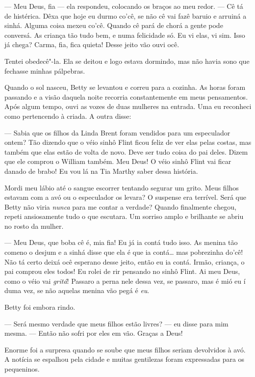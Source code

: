 --- Meu Deus, fia --- ela respondeu, colocando os braços ao meu redor.
--- Cê tá de histérica. Dêxa que hoje eu durmo co'cê, se não cê vai fazê
baruio e arruiná a sinhá. Alguma coisa mexeu co'cê. Quando cê pará de
chorá a gente pode conversá. As criança tão tudo bem, e numa felicidade
só. Eu vi elas, vi sim. Isso já chega? Carma, fia, fica quieta! Desse
jeito vão ouvi ocê.

Tentei obedecê"-la. Ela se deitou e logo estava dormindo, mas não havia
sono que fechasse minhas pálpebras.

Quando o sol nasceu, Betty se levantou
e correu para a cozinha. As horas foram passando e a visão daquela noite
recorria constantemente em meus pensamentos. Após algum tempo, ouvi as
vozes de duas mulheres na entrada. Uma eu reconheci como pertencendo à
criada. A outra disse:

--- Sabia que os filhos da Linda Brent foram vendidos para um
especulador ontem? Tão dizendo que o véio sinhô Flint ficou feliz de ver
elas pelas costas, mas também que elas estão de volta de novo. Deve ser
tudo coisa do pai deles. Dizem que ele comprou o William também. Meu
Deus! O véio sinhô Flint vai ficar danado de brabo! Eu vou lá na Tia
Marthy saber dessa história.

Mordi meu lábio até o sangue escorrer
tentando segurar um grito. Meus filhos estavam com a avó ou o
especulador os levara? O suspense era terrível. Será que Betty não viria
\emph{nunca} para me contar a verdade? Quando finalmente chegou, repeti
ansiosamente tudo o que escutara. Um sorriso amplo e brilhante se abriu
no rosto da mulher.

--- Meu Deus, que boba cê é, mia fia! Eu já ia contá tudo isso. As
menina tão comeno o desjum e a sinhá disse que ela é que ia
contá\ldots{} mas pobrezinha do'cê! Não tá certo deixá ocê esperano
desse jeito, então eu ia contá. Irmão, criança, o pai comprou eles
todos! Eu rolei de rir pensando no sinhô Flint. Ai meu Deus, como o véio
vai \emph{gritá}! Passaro a perna nele dessa vez, se passaro, mas é mió
eu í duma vez, se não aquelas menina vão pegá é \emph{eu}.

Betty foi embora rindo.

--- Será mesmo verdade que meus filhos estão livres? --- eu disse para
mim mesma. --- Então não sofri por eles em vão. Graças a Deus!

Enorme foi a surpresa quando se soube
que meus filhos seriam devolvidos à avó. A notícia se espalhou pela
cidade e muitas gentilezas foram expressadas para os pequeninos.

